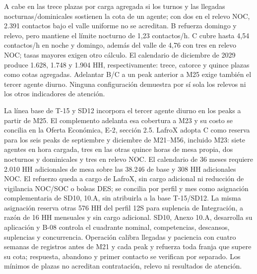 A cabe en las trece plazas por carga agregada si los turnos y las llegadas nocturnas/dominicales sostienen la cota de un agente; con dos en el relevo NOC, 2.391 contactos bajo el valle uniforme no se acreditan. B refuerza domingo y relevo, pero mantiene el límite nocturno de 1,23 contactos/h. C cubre hasta 4,54 contactos/h en noche y domingo, además del valle de 4,76 con tres en relevo NOC; tasas mayores exigen otro cálculo. El calendario de diciembre de 2029 produce 1.628, 1.748 y 1.904 HH, respectivamente: trece, catorce y quince plazas como cotas agregadas. Adelantar B/C a un peak anterior a M25 exige también el tercer agente diurno. Ninguna configuración demuestra por sí sola los relevos ni los otros indicadores de atención.

La línea base de T-15 y SD12 incorpora el tercer agente diurno en los peaks a partir de M25. El complemento adelanta esa cobertura a M23 y su costo se concilia en la Oferta Económica, E-2, sección 2.5. LafroX adopta C como reserva para los seis peaks de septiembre y diciembre de M21--M56, incluido M23: siete agentes en hora cargada, tres en las otras quince horas de mesa propia, dos nocturnos y dominicales y tres en relevo NOC. El calendario de 36 meses requiere 2.010 HH adicionales de mesa sobre las 38.246 de base y 308 HH adicionales NOC. El refuerzo queda a cargo de LafroX, sin cargo adicional ni reducción de vigilancia NOC/SOC o bolsas DES; se concilia por perfil y mes como asignación complementaria de SD10, 10.A, sin atribuirla a la base T-15/SD12. La misma asignación reserva otras 576 HH del perfil 12S para suplencia de Integración, a razón de 16 HH mensuales y sin cargo adicional. SD10, Anexo 10.A, desarrolla su aplicación y B-08 controla el cuadrante nominal, competencias, descansos, suplencias y concurrencia. Operación calibra llegadas y paciencia con cuatro semanas de registros antes de M21 y cada peak y refuerza toda franja que supere su cota; respuesta, abandono y primer contacto se verifican por separado. Los mínimos de plazas no acreditan contratación, relevo ni resultados de atención.

